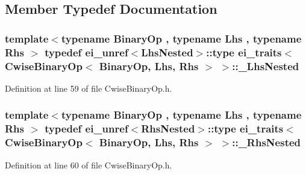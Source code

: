 \subsection{Member Typedef Documentation}
\hypertarget{structei__traits_3_01_cwise_binary_op_3_01_binary_op_00_01_lhs_00_01_rhs_01_4_01_4_a8d4bc0c828c39597315c44cbca2d5c0a}{
\subsubsection[{\-\_\-\-Lhs\-Nested}]{\setlength{\rightskip}{0pt plus 5cm}template$<$typename Binary\-Op , typename Lhs , typename Rhs $>$ typedef {\bf ei\-\_\-unref}$<${\bf Lhs\-Nested}$>$\-::{\bf type} {\bf ei\-\_\-traits}$<$ {\bf Cwise\-Binary\-Op}$<$ Binary\-Op, Lhs, Rhs $>$ $>$\-::{\bf \-\_\-\-Lhs\-Nested}}}\label{structei__traits_3_01_cwise_binary_op_3_01_binary_op_00_01_lhs_00_01_rhs_01_4_01_4_a8d4bc0c828c39597315c44cbca2d5c0a}


Definition at line 59 of file Cwise\-Binary\-Op.\-h.

\hypertarget{structei__traits_3_01_cwise_binary_op_3_01_binary_op_00_01_lhs_00_01_rhs_01_4_01_4_ab21c2e3b42e050b6613140088a1bf9da}{
\subsubsection[{\-\_\-\-Rhs\-Nested}]{\setlength{\rightskip}{0pt plus 5cm}template$<$typename Binary\-Op , typename Lhs , typename Rhs $>$ typedef {\bf ei\-\_\-unref}$<${\bf Rhs\-Nested}$>$\-::{\bf type} {\bf ei\-\_\-traits}$<$ {\bf Cwise\-Binary\-Op}$<$ Binary\-Op, Lhs, Rhs $>$ $>$\-::{\bf \-\_\-\-Rhs\-Nested}}}\label{structei__traits_3_01_cwise_binary_op_3_01_binary_op_00_01_lhs_00_01_rhs_01_4_01_4_ab21c2e3b42e050b6613140088a1bf9da}


Definition at line 60 of file Cwise\-Binary\-Op.\-h.

